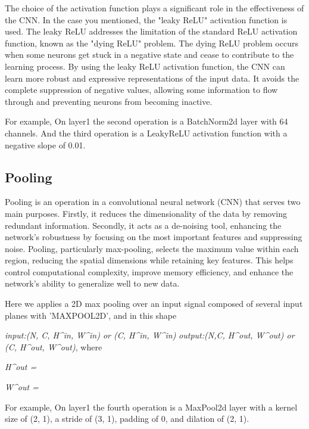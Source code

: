 \documentclass{article}
\begin{document}
The choice of the activation function plays a significant role in the effectiveness of the CNN. In the case you mentioned, the "leaky ReLU" activation function is used. The leaky ReLU addresses the limitation of the standard ReLU activation function, known as the "dying ReLU" problem. The dying ReLU problem occurs when some neurons get stuck in a negative state and cease to contribute to the learning process. By using the leaky ReLU activation function, the CNN can learn more robust and expressive representations of the input data. It avoids the complete suppression of negative values, allowing some information to flow through and preventing neurons from becoming inactive.

For example, On layer1 the second operation is a BatchNorm2d layer with 64 channels. And the third operation is a LeakyReLU activation function with a negative slope of 0.01.

\subsection{Pooling}

Pooling is an operation in a convolutional neural network (CNN) that serves two main purposes. Firstly, it reduces the dimensionality of the data by removing redundant information. Secondly, it acts as a de-noising tool, enhancing the network's robustness by focusing on the most important features and suppressing noise. Pooling, particularly max-pooling, selects the maximum value within each region, reducing the spatial dimensions while retaining key features. This helps control computational complexity, improve memory efficiency, and enhance the network's ability to generalize well to new data.

Here we applies a 2D max pooling over an input signal composed of several input planes with ’MAXPOOL2D’, and in this shape

\textbullet\emph{ input:(N, C, H^{in}, W^{in}) or (C, H^{in}, W^{in})}
\textbullet\emph{output:(N,C, H^{out}, W^{out}) or (C, H^{out}, W^{out})}, where

\emph{H^{out} = \right}

\emph{W^{out} = \right}

For example, On layer1 the fourth operation is a MaxPool2d layer with a kernel size of (2, 1), a stride of (3, 1), padding of 0, and dilation of (2, 1).
\end{document}
